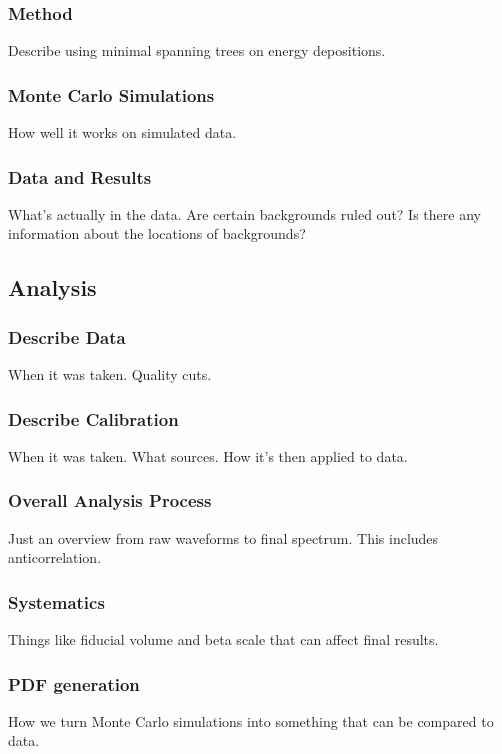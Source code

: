 \documentclass[12pt,letterpaper,onecolumn]{article}
\begin{document}
\subsubsection{Method}
Describe using minimal spanning trees on energy depositions.

\subsubsection{Monte Carlo Simulations}
How well it works on simulated data.

\subsubsection{Data and Results}
What's actually in the data. Are certain backgrounds ruled out? Is there any information about the locations of backgrounds?

\subsection{Analysis}

\subsubsection{Describe Data}
When it was taken. Quality cuts.

\subsubsection{Describe Calibration}
When it was taken. What sources. How it's then applied to data.

\subsubsection{Overall Analysis Process}
Just an overview from raw waveforms to final spectrum. This includes anticorrelation.

\subsubsection{Systematics}
Things like fiducial volume and beta scale that can affect final results.

\subsubsection{PDF generation}
How we turn Monte Carlo simulations into something that can be compared to data.
\end{document}
